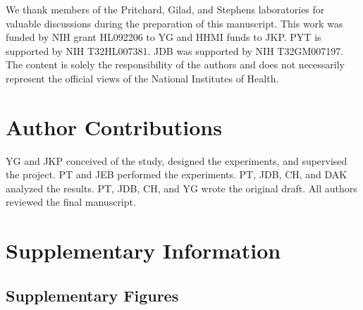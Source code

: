 We thank members of the Pritchard, Gilad, and Stephens laboratories for
valuable discussions during the preparation of this manuscript. This
work was funded by NIH grant HL092206 to YG and HHMI funds to JKP. PYT
is supported by NIH T32HL007381. JDB was supported by NIH T32GM007197.
The content is solely the responsibility of the authors and does not
necessarily represent the official views of the National Institutes of
Health.

\section{Author Contributions}\label{ch04-author-contributions}

YG and JKP conceived of the study, designed the experiments, and
supervised the project. PT and JEB performed the experiments. PT, JDB,
CH, and DAK analyzed the results. PT, JDB, CH, and YG wrote the original
draft. All authors reviewed the final manuscript.

\clearpage
\section{Supplementary Information}\label{ch04-supplementary-information}

\subsection{Supplementary Figures}\label{ch04-supplementary-figures}

